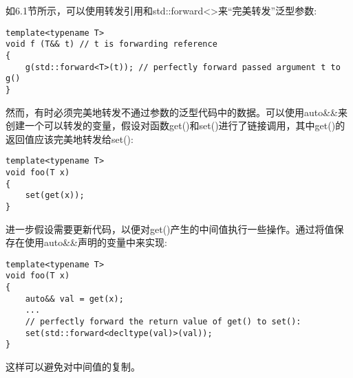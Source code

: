 如6.1节所示，可以使用转发引用和std::forward<>来“完美转发”泛型参数:

\begin{lstlisting}[style=styleCXX]
template<typename T>
void f (T&& t) // t is forwarding reference
{
	g(std::forward<T>(t)); // perfectly forward passed argument t to g()
}
\end{lstlisting}

然而，有时必须完美地转发不通过参数的泛型代码中的数据。可以使用auto\&\&来创建一个可以转发的变量，假设对函数get()和set()进行了链接调用，其中get()的返回值应该完美地转发给set():

\begin{lstlisting}[style=styleCXX]
template<typename T>
void foo(T x)
{
	set(get(x));
}
\end{lstlisting}

进一步假设需要更新代码，以便对get()产生的中间值执行一些操作。通过将值保存在使用auto\&\&声明的变量中来实现:

\begin{lstlisting}[style=styleCXX]
template<typename T>
void foo(T x)
{
	auto&& val = get(x);
	...
	// perfectly forward the return value of get() to set():
	set(std::forward<decltype(val)>(val));
}
\end{lstlisting}

这样可以避免对中间值的复制。








































